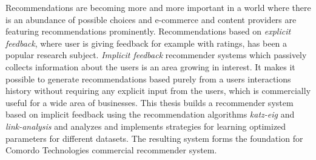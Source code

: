 
Recommendations are becoming more and more important in a world where there is an abundance of possible choices and e-commerce and content providers are featuring recommendations prominently. Recommendations based on \textit{explicit feedback}, where user is giving feedback for example with ratings, has been a popular research subject. \textit{Implicit feedback} recommender systems which passively collects information about the users is an area growing in interest. It makes it possible to generate recommendations based purely from a users interactions history without requiring any explicit input from the users, which is commercially useful for a wide area of businesses. This thesis builds a recommender system based on implicit feedback using the recommendation algorithms \textit{katz-eig} and \textit{link-analysis} and analyzes and implements strategies for learning optimized parameters for different datasets. The resulting system forms the foundation for Comordo Technologies commercial recommender system.

